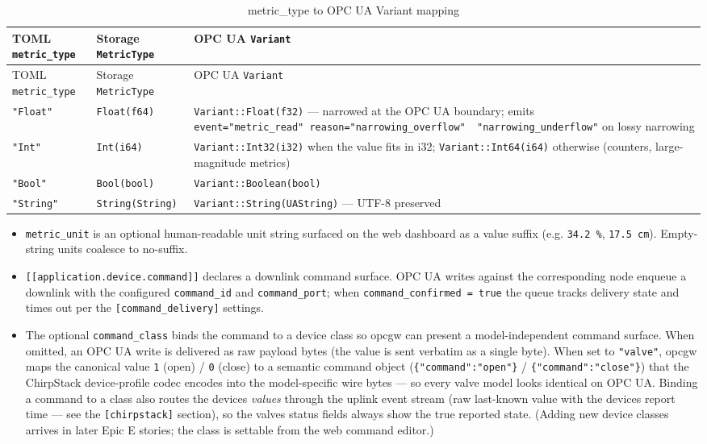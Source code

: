 \begin{longtable}[]{@{}lll@{}}
\caption{metric\_type to OPC UA Variant mapping}\tabularnewline
\toprule\noalign{}
TOML \texttt{metric\_type} & Storage \texttt{MetricType} & OPC UA \texttt{Variant} \\
\midrule\noalign{}
\endfirsthead
\toprule\noalign{}
TOML \texttt{metric\_type} & Storage \texttt{MetricType} & OPC UA \texttt{Variant} \\
\midrule\noalign{}
\endhead
\bottomrule\noalign{}
\endlastfoot
\texttt{"Float"} & \texttt{Float(f64)} & \texttt{Variant::Float(f32)} --- narrowed at the OPC UA boundary; emits \texttt{event="metric\_read"\ reason="narrowing\_overflow"\ \textbar{}\ "narrowing\_underflow"} on lossy narrowing \\
\texttt{"Int"} & \texttt{Int(i64)} & \texttt{Variant::Int32(i32)} when the value fits in i32; \texttt{Variant::Int64(i64)} otherwise (counters, large-magnitude metrics) \\
\texttt{"Bool"} & \texttt{Bool(bool)} & \texttt{Variant::Boolean(bool)} \\
\texttt{"String"} & \texttt{String(String)} & \texttt{Variant::String(UAString)} --- UTF-8 preserved \\
\end{longtable}

\begin{itemize}
\item
  \texttt{metric\_unit} is an optional human-readable unit string surfaced on the web dashboard as a value suffix (e.g. \texttt{34.2\ \%}, \texttt{17.5\ cm}). Empty-string units coalesce to no-suffix.
\item
  \texttt{{[}{[}application.device.command{]}{]}} declares a downlink command surface. OPC UA writes against the corresponding node enqueue a downlink with the configured \texttt{command\_id} and \texttt{command\_port}; when \texttt{command\_confirmed\ =\ true} the queue tracks delivery state and times out per the \texttt{{[}command\_delivery{]}} settings.
\item
  The optional \texttt{command\_class} binds the command to a device class so opcgw can present a model-independent command surface. When omitted, an OPC UA write is delivered as raw payload bytes (the value is sent verbatim as a single byte). When set to \texttt{"valve"}, opcgw maps the canonical value \texttt{1} (open) / \texttt{0} (close) to a semantic command object (\texttt{\{"command":"open"\}} / \texttt{\{"command":"close"\}}) that the ChirpStack device-profile codec encodes into the model-specific wire bytes --- so every valve model looks identical on OPC UA. Binding a command to a class also routes the device\textquotesingle s \emph{values} through the uplink event stream (raw last-known value with the device\textquotesingle s report time --- see the \texttt{{[}chirpstack{]}} section), so the valve\textquotesingle s status fields always show the true reported state. (Adding new device classes arrives in later Epic E stories; the class is settable from the web command editor.)
\end{itemize}

